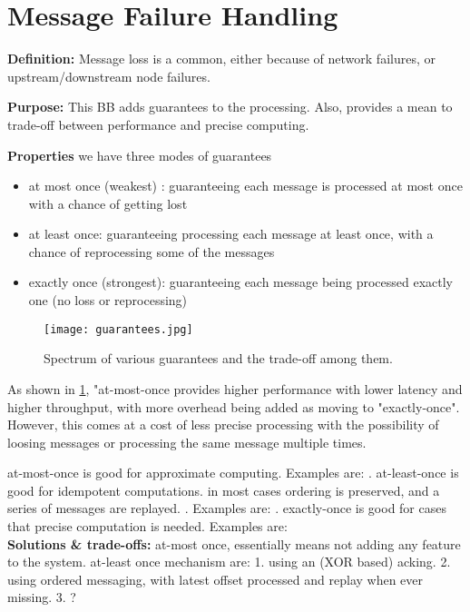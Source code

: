 \section{Message Failure Handling}

	\noindent\textbf{Definition:} Message loss is a common, either because of network failures, or upstream/downstream node failures.

	\noindent \textbf{Purpose:} This BB adds guarantees to the processing. Also, provides a mean to trade-off between performance and precise computing.
	
	\noindent \textbf{Properties}
	we have three modes of guarantees 
	\begin{itemize}
		\item at most once (weakest) : guaranteeing each message is processed at most once with a chance of getting lost
		\item at least once: guaranteeing processing each message at least once, with a chance of reprocessing some of the messages
		\item exactly once (strongest): guaranteeing each message being processed exactly one (no loss or reprocessing)
	\end{itemize}	 

	\begin{figure}[h]
		\centering
		\texttt{[image: guarantees.jpg]}
		\caption{Spectrum of various guarantees and the trade-off among them.}
		\label{fig:guarantees}
	\end{figure}
	
	 As shown in \ref{fig:guarantees}, "at-most-once provides higher performance with lower latency and higher throughput, with more overhead being added as moving to "exactly-once". However, this comes at a cost of less precise processing with the possibility of loosing messages or processing the same message multiple times.
	 
	at-most-once is good for approximate computing. Examples are: . at-least-once is good for idempotent computations. in most cases ordering is preserved, and a series of messages are replayed. . Examples are: .  exactly-once is good for cases that precise computation is needed. Examples are: \\
	

\noindent \textbf{Solutions \& trade-offs:} at-most once, essentially means not adding any feature to the system. at-least once mechanism are: 1. using an (XOR based) acking. 2. using ordered messaging, with latest offset processed and replay when ever missing. 3. ?


